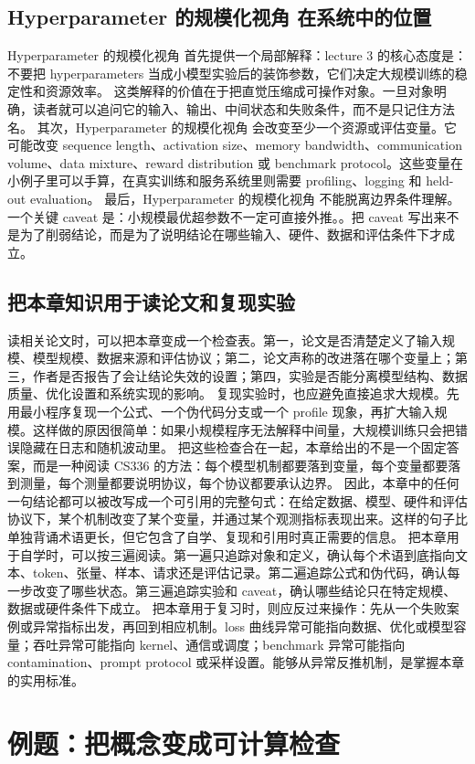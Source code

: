 \documentclass[a4paper]{article}
\begin{document}
\subsection{Hyperparameter 的规模化视角 在系统中的位置}
Hyperparameter 的规模化视角 首先提供一个局部解释：lecture 3 的核心态度是：不要把 hyperparameters 当成小模型实验后的装饰参数，它们决定大规模训练的稳定性和资源效率。 这类解释的价值在于把直觉压缩成可操作对象。一旦对象明确，读者就可以追问它的输入、输出、中间状态和失败条件，而不是只记住方法名。
其次，Hyperparameter 的规模化视角 会改变至少一个资源或评估变量。它可能改变 sequence length、activation size、memory bandwidth、communication volume、data mixture、reward distribution 或 benchmark protocol。这些变量在小例子里可以手算，在真实训练和服务系统里则需要 profiling、logging 和 held-out evaluation。
最后，Hyperparameter 的规模化视角 不能脱离边界条件理解。一个关键 caveat 是：小规模最优超参数不一定可直接外推。。把 caveat 写出来不是为了削弱结论，而是为了说明结论在哪些输入、硬件、数据和评估条件下才成立。
\subsection{把本章知识用于读论文和复现实验}
读相关论文时，可以把本章变成一个检查表。第一，论文是否清楚定义了输入规模、模型规模、数据来源和评估协议；第二，论文声称的改进落在哪个变量上；第三，作者是否报告了会让结论失效的设置；第四，实验是否能分离模型结构、数据质量、优化设置和系统实现的影响。
复现实验时，也应避免直接追求大规模。先用最小程序复现一个公式、一个伪代码分支或一个 profile 现象，再扩大输入规模。这样做的原因很简单：如果小规模程序无法解释中间量，大规模训练只会把错误隐藏在日志和随机波动里。
把这些检查合在一起，本章给出的不是一个固定答案，而是一种阅读 CS336 的方法：每个模型机制都要落到变量，每个变量都要落到测量，每个测量都要说明协议，每个协议都要承认边界。
因此，本章中的任何一句结论都可以被改写成一个可引用的完整句式：在给定数据、模型、硬件和评估协议下，某个机制改变了某个变量，并通过某个观测指标表现出来。这样的句子比单独背诵术语更长，但它包含了自学、复现和引用时真正需要的信息。
把本章用于自学时，可以按三遍阅读。第一遍只追踪对象和定义，确认每个术语到底指向文本、token、张量、样本、请求还是评估记录。第二遍追踪公式和伪代码，确认每一步改变了哪些状态。第三遍追踪实验和 caveat，确认哪些结论只在特定规模、数据或硬件条件下成立。
把本章用于复习时，则应反过来操作：先从一个失败案例或异常指标出发，再回到相应机制。loss 曲线异常可能指向数据、优化或模型容量；吞吐异常可能指向 kernel、通信或调度；benchmark 异常可能指向 contamination、prompt protocol 或采样设置。能够从异常反推机制，是掌握本章的实用标准。
\section{例题：把概念变成可计算检查}
\end{document}
